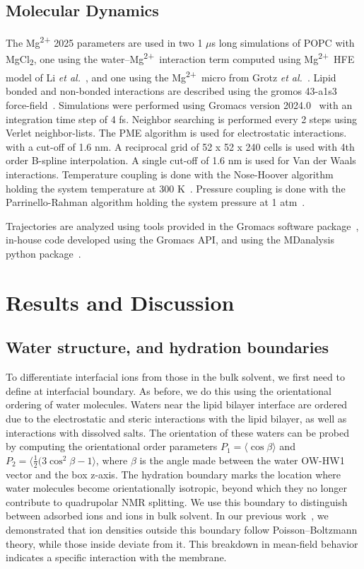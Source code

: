 \documentclass[journal=langd5,manuscript=article]{achemso}
\newcommand{\etal}{\textit{et al.}}
\newcommand{\mg}{Mg\textsuperscript{2+}}
\newcommand{\mgcl}{MgCl\textsubscript{2}}
\begin{document}
\subsection{Molecular Dynamics}
The \mg{ 2025} parameters are used in
two 1 $\mu$s long simulations of POPC with \mgcl{}, one using the water--\mg~interaction term computed using \mg~HFE model of Li \etal~\cite{merzhfe}, and
one using the \mg~micro from Grotz \etal~\cite{grotz:2021:optimized,micro}. 
Lipid bonded and non-bonded interactions are described using the gromos 43-a1s3 force-field~\cite{chiu:2009}.
Simulations were performed using Gromacs version 
2024.0~\cite{gromacs}
with an integration time step of 4 fs.
Neighbor searching is performed every 2 steps using Verlet neighbor-lists.
The PME algorithm is used for electrostatic interactions.
with a cut-off of 1.6 nm.
A reciprocal grid of 52 x 52 x 240 cells is used with 4th order B-spline interpolation.
A single cut-off of 1.6 nm is used for Van der Waals interactions.
Temperature coupling is done with the Nose-Hoover algorithm holding the system temperature at 300 K~\cite{nose:1983}.
Pressure coupling is done with the Parrinello-Rahman algorithm holding the system pressure at 1 atm~\cite{parrinello:1981}.

Trajectories are analyzed using tools provided in the Gromacs software package~\cite{gromacs}, in-house code developed using the Gromacs API, and using the MDanalysis python package~\cite{mdanalysis1,mdanalysis2}.

\section{Results and Discussion}

\subsection{Water structure, and hydration boundaries}
To differentiate interfacial ions from those in the bulk solvent, we first need to define at interfacial boundary. As before\cite{saunders:2024}, we do this using the orientational ordering of water molecules. Waters near the lipid bilayer interface are ordered due to the electrostatic and steric interactions with the lipid bilayer, as well as interactions with dissolved salts. The
orientation of these waters can be probed by computing the orientational order parameters $P_1=\langle\cos{\beta}\rangle$ and $P_2=\langle{\frac{1}{2}(3\cos^{2}{\beta}-1}\rangle$, where $\beta$ is the angle made between the water OW-HW1 vector and the box z-axis. The hydration boundary marks the location where water molecules become orientationally isotropic, beyond which they no longer contribute to quadrupolar NMR splitting. We use this boundary to distinguish between adsorbed ions and ions in bulk solvent. In our previous work~\cite{saunders:2024}, we demonstrated that ion densities outside this boundary follow Poisson–Boltzmann theory, while those inside deviate from it. This breakdown in mean-field behavior indicates a specific interaction with the membrane. 
\end{document}
